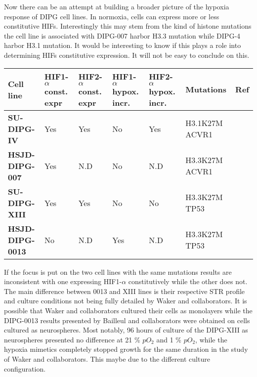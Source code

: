 \documentclass[11pt,a4paper]{article}
\begin{document}
Now there can be an attempt at building a broader picture of the hypoxia response of DIPG cell lines. In normoxia, cells can express more or less constitutive HIFs. Interestingly this may stem from the kind of histone mutations the cell line is associated with DIPG-007 harbor H3.3 mutation while DIPG-4 harbor H3.1 mutation.\cite{Katagi2021} It would be interesting to know if this plays a role into determining HIFs constitutive expression. It will not be easy to conclude on this.

\begin{table}[h]
\begin{center}
\begin{tabular}{ |p{18mm}|p{18mm}|p{18mm}|p{18mm}|p{18mm}|p{18mm}|p{18mm}| }
\hline
\textbf{Cell line} & HIF1-$\alpha$ const. expr & HIF2-$\alpha$ const. expr & HIF1-$\alpha$ hypox. incr. & HIF2-$\alpha$ hypox. incr. & Mutations & Ref \\
\hline
\textbf{SU-DIPG-IV} & Yes & Yes & No & Yes & H3.1K27M ACVR1 & \cite{Waker2018} \\
\hline
\textbf{HSJD-DIPG-007} & Yes & N.D & No & N.D & H3.3K27M ACVR1 &\cite{Bailleul2021} \\
\hline
\textbf{SU-DIPG-XIII} & Yes & Yes & No & No & H3.3K27M TP53 & \cite{Waker2018} \\
\hline
\textbf{HSJD-DIPG-0013} & No & N.D & Yes & N.D & H3.3K27M TP53  & \cite{Bailleul2021} \\
\hline
\end{tabular}
\end{center}
\end{table}

If the focus is put on the two cell lines with the same mutations results are inconsistent with one expressing HIF1-$\alpha$ constitutively while the other does not. The main difference between 0013 and XIII lines is their respective STR profile and culture conditions not being fully detailed by Waker and collaborators. It is possible that Waker and collaborators cultured their cells as monolayers while the DIPG-0013 results presented by Bailleul and collaborators were obtained on cells cultured as neurospheres. Most notably, 96 hours of culture of the DIPG-XIII as neurospheres presented no difference at 21 \% $pO_2$ and 1 \% $pO_2$\cite{Bailleul2021}, while the hypoxia mimetics completely stopped growth for the same duration in the study of Waker and collaborators.\cite{Waker2018} This maybe due to the different culture configuration.
\end{document}
